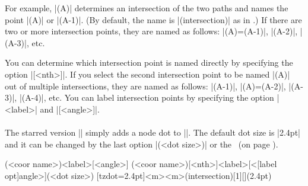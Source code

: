 For example, |(A)| determines an intersection of the two paths and names the point |(A)| or |(A-1)|. (By default, the name is |(intersection)| as in \Tikz.)
If there are two or more intersection points, they are named as follows: |(A)=(A-1)|, |(A-2)|, |(A-3)|, etc.

You can determine which intersection point is named directly by specifying the option |[<nth>]|. If you select the second intersection point to be named |(A)| out of multiple intersections, they are named as follows: |(A-1)|, |(A)=(A-2)|, |(A-3)|, |(A-4)|, etc.
You can label intersection points by specifying the option |{<label>}| and |[<angle>]|.


\begin{tzcode}{.3}
{}
\end{tzcode}


\paragraph{\icmd{\tzXpoint*}} The starred version |\tzXpoint*| simply adds a node dot to |\tzXpoint|.
The default dot size is |2.4pt| and it can be changed by the last option |(<dot size>)| or the \threeways\ (on page \pageref{ss:threeways}).

\begin{tzdef}{}
(<coor name>){<label>}[<angle>]
          (<coor name>)[<nth>]{<label>}[<[label opt]angle>](<dot size>)
  [tzdot=2.4pt]{<m>}{<m>}(intersection)[1]{}[](2.4pt)
\end{tzdef}


\begin{tzcode}{.3}
{}
\end{tzcode}



